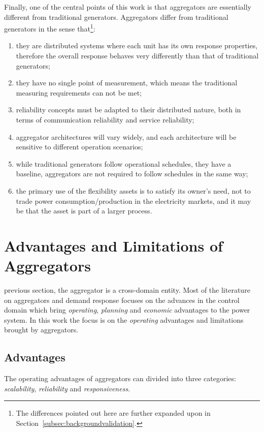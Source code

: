 Finally, one of the central points of this work is that aggregators are essentially different from traditional generators. Aggregators differ from traditional generators in the sense that\footnote{The differences pointed out here are further expanded upon in Section~\ref{subsec:backgroundvalidation}.}:
\begin{enumerate}
	\item they are distributed systems where each unit has its own response properties, therefore the overall response behaves very differently than that of traditional generators;\label{point:aggblackbox}
	\item they have no single point of measurement, which means the traditional measuring requirements can not be met;
	\item reliability concepts must be adapted to their distributed nature, both in terms of communication reliability and service reliability;
	\item aggregator architectures will vary widely, and each architecture will be sensitive to different operation scenarios;
	\item while traditional generators follow operational schedules, \ie they have a baseline, aggregators are not required to follow schedules in the same way;
	\item the primary use of the flexibility assets is to satisfy its owner's need, not to trade power consumption/production in the electricity markets, and it may be that the asset is part of a larger process.
\end{enumerate}

\section{Advantages and Limitations of Aggregators}\label{sec:aggadvantlim}
 previous section, the aggregator is a cross-domain entity. Most of the literature on aggregators and demand response focuses on the advances in the control domain which bring \emph{operating}, \emph{planning} and \emph{economic} advantages to the power system. In this work the focus is on the \emph{operating} advantages and limitations brought by aggregators. 
\subsection*{Advantages}
The operating advantages of aggregators can divided into three categories: \emph{scalability}, \emph{reliability} and \emph{responsiveness}.

